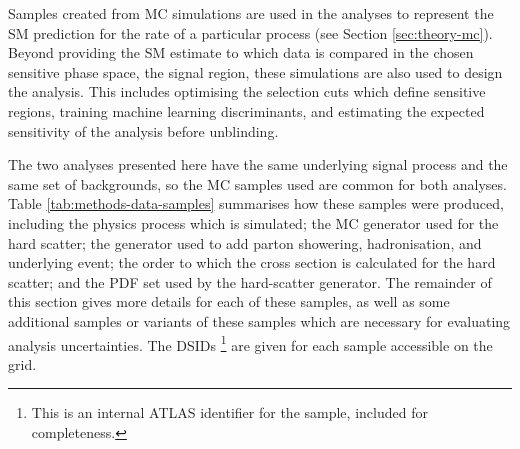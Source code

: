
Samples created from \ac{MC} simulations are used in the analyses to represent
the \ac{SM} prediction for the rate of a particular process (see Section
\ref{sec:theory-mc}). Beyond providing the \ac{SM} estimate to which data is
compared in the chosen sensitive phase space, the signal region, these
simulations are also used to design the analysis. This includes optimising
the selection cuts which define sensitive regions, training machine learning
discriminants, and estimating the expected sensitivity of the analysis before
unblinding.

The two analyses presented here have the same underlying signal process and the
same set of backgrounds, so the \ac{MC} samples used are common for both
analyses. Table \ref{tab:methods-data-samples} summarises how these samples
were produced, including the physics process which is simulated; the \ac{MC}
generator used for the hard scatter; the generator used to add parton showering,
hadronisation, and underlying event; the order to which the cross section is
calculated for the hard scatter; and the \ac{PDF} set used by the hard-scatter
generator. The remainder of this section gives more details for each of
these samples, as well as some additional samples or variants of these samples
which are necessary for evaluating analysis uncertainties. The \acp{DSID}%
\footnote{
  This is an internal \acs{ATLAS} identifier for the sample, included for
  completeness.
}
are given for each sample accessible on the grid.

